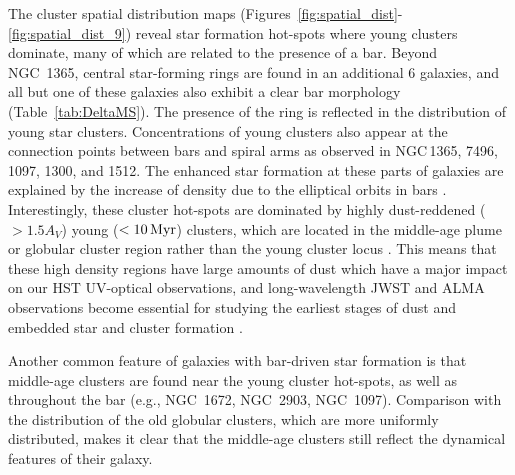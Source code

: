 \documentclass[linenumbers]{aastex63}
\begin{document}
 The cluster spatial distribution maps (Figures~\ref{fig:spatial_dist}-\ref{fig:spatial_dist_9}) reveal star formation hot-spots where young clusters dominate, many of which are related to the presence of a bar. %
Beyond NGC~1365, central star-forming rings are found in an additional 6 galaxies, and all but one of these galaxies also exhibit 
a clear bar morphology (Table~\ref{tab:DeltaMS}).  The presence of the ring is reflected in the distribution of young star clusters.
Concentrations of young clusters also appear at the connection points between bars and spiral arms as observed in NGC\,1365, 7496, 1097, 1300, and 1512. The enhanced star formation at these parts of galaxies are explained by the increase of density due to the elliptical orbits in bars \citep[e.g.][]{nguyen_luong_w43_2011,beuther_interactions_2017,tress_simulations_2020,sormani_simulations_2020,levy_morpho-kinematic_2022}. 
Interestingly, these cluster hot-spots are dominated by highly dust-reddened ($>1.5 A_V$) young ($<{\rm 10\,Myr}$) clusters, which are located in the middle-age plume or globular cluster region rather than the young cluster locus \citep{whitmore_improving_2023, thilker23sed}. This means that these high density regions have large amounts of dust which have a major impact on our HST UV-optical observations, and long-wavelength JWST and ALMA observations become essential for studying the earliest stages of dust and embedded star and cluster formation \citep[e.g.][]{johnson_physical_2015, leroy_phangs-alma_2021, emig_super_2020,rico-villas_super_2020, costa_toward_2021, levy_outflows_2021, levy_morpho-kinematic_2022, schinnerer_phangs-jwst_2023, whitmore_phangs-jwst_2023, linden_goals-jwst_2023, sun_hidden_2024}.

Another common feature of galaxies with bar-driven star formation is that middle-age clusters are found near the young cluster hot-spots, as well as throughout the bar (e.g., NGC~1672, NGC~2903, NGC~1097).  Comparison with the distribution of the old globular clusters, which are more uniformly distributed, makes it clear that the middle-age clusters still reflect the dynamical features of their galaxy.
\end{document}
